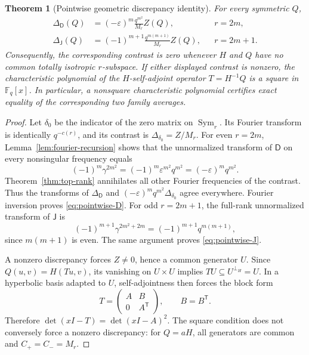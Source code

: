 \documentclass[11pt,a4paper]{article}
\newtheorem{theorem}{Theorem}[section]
\theoremstyle{definition}
\theoremstyle{remark}
\newcommand{\F}{\mathbb F}
\newcommand{\Sym}{\operatorname{Sym}}
\newcommand{\eps}{\varepsilon}
\newcommand{\J}{\mathsf J}
\newcommand{\D}{\mathsf D}
\begin{document}
\begin{theorem}[Pointwise geometric discrepancy identity]
\label{thm:pointwise}
For every symmetric $Q$,
\begin{align}
 \Delta_\D(Q)&=(-\eps)^m\frac{q^{m^2}}{M_r}Z(Q),
 &&r=2m,\label{eq:pointwise-D}\\
 \Delta_\J(Q)&=(-1)^{m+1}\frac{q^{m(m+1)}}{M_r}Z(Q),
 &&r=2m+1.\label{eq:pointwise-J}
\end{align}
Consequently, the corresponding contrast is zero whenever $H$ and $Q$
have no common totally isotropic $r$-subspace.
If either displayed contrast is nonzero, the characteristic polynomial
of the $H$-self-adjoint operator $T=H^{-1}Q$ is a square in $\F_q[x]$.
In particular, a nonsquare characteristic polynomial certifies exact
equality of the corresponding two family averages.
\end{theorem}
\begin{proof}
Let $\delta_0$ be the indicator of the zero matrix on $\Sym_r$.
Its Fourier transform is identically $q^{-c(r)}$, and its contrast is
$\Delta_{\delta_0}=Z/M_r$.
For even $r=2m$, Lemma~\ref{lem:fourier-recursion} shows that the
unnormalized transform of $\D$ on every nonsingular frequency equals
\[
 (-1)^m\gamma^{2m^2}=(-1)^m\eps^{m^2}q^{m^2}
 =(-\eps)^m q^{m^2}.
\]
Theorem~\ref{thm:top-rank} annihilates all other Fourier frequencies of
the contrast. Thus the transforms of $\Delta_\D$ and
$(-\eps)^m q^{m^2}\Delta_{\delta_0}$ agree everywhere. Fourier inversion
proves \eqref{eq:pointwise-D}. For odd $r=2m+1$, the full-rank
unnormalized transform of $\J$ is
\[
 (-1)^{m+1}\gamma^{2m^2+2m}=(-1)^{m+1}q^{m(m+1)},
\]
since $m(m+1)$ is even. The same argument proves
\eqref{eq:pointwise-J}.

A nonzero discrepancy forces $Z\ne0$, hence a common generator $U$.
Since $Q(u,v)=H(Tu,v)$, its vanishing on $U\times U$ implies
$TU\subseteq U^{\perp_H}=U$. In a hyperbolic basis adapted to $U$,
self-adjointness then forces the block form
\[
 T=\begin{pmatrix}A&B\\0&A^{\mathsf T}\end{pmatrix},\qquad B=B^{\mathsf T}.
\]
Therefore $\det(xI-T)=\det(xI-A)^2$.
The square condition does not conversely force a nonzero discrepancy:
for $Q=aH$, all generators are common and $C_+=C_-=M_r$.
\end{proof}
\end{document}
